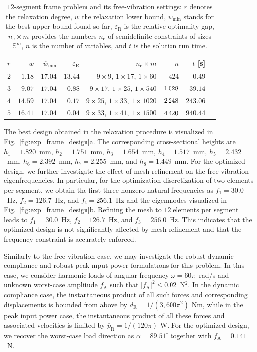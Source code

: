 \documentclass[preprint,3p]{elsarticle}
\newcommand{\A}{\mathrm{A}}
\newcommand{\R}{\mathrm{R}}
\numberwithin{equation}{section}
\begin{document}
\begin{table}[!b]
  \centering
    \begin{tabular}{lrrrrrrr}
		$r$ & $\underline{w}$ & $\overline{w}_{\min}$ & $\varepsilon_\R$ & $n_\mathrm{c}\times m$ & $n$ & $t$ [s]\\
		\hline
		$2$ & {$1.18$} & {$17.04$} & {$13.44$} & $9\times9$, $1\times 17$, $1\times60$ & $424$ & {$0.49$} \\
		$3$ & {$9.07$} & {$17.04$} & {$0.88$} & $9\times17$, $1\times 25$, $1\times540$ & $1\thinspace028$ & {$39.14$} \\
		$4$ & {$14.59$} & {$17.04$} & {$0.17$} & $9\times25$, $1\times 33$, $1\times1020$ & $2\thinspace248$ & {$243.06$} \\
		$5$ & {$16.41$} & {$17.04$} & {$0.04$} & $9\times33$, $1\times 41$, $1\times1500$ & $4\thinspace420$ & {$940.44$} \\
    \end{tabular}
    \caption{$12$-segment frame problem and its free-vibration settings: $r$ denotes the relaxation degree, $\underline{w}$ the relaxation lower bound, $\overline{w}_{\min}$ stands for the best upper bound found so far, $\varepsilon_\R$ is the relative optimality gap, $n_\mathrm{c} \times m$ provides the numbers $n_\mathrm{c}$ of semidefinite constraints of sizes $\mathbb{S}^m$, $n$ is the number of variables, and $t$ is the solution run time.}
    \label{tab:frame12}
\end{table}

The best design obtained in the relaxation procedure is visualized in Fig.~\ref{fig:exp_frame_design}a. The corresponding cross-sectional heights are $h_1 = 1.820$~mm, $h_2 = 1.751$~mm, $h_3 = 1.654$~mm, $h_4 = 1.517$~mm, $h_5 = 2.432$~mm, $h_6 = 2.392$~mm, $h_7 = 2.255$~mm, and $h_8 = 1.449$~mm. For the optimized design, we further investigate the effect of mesh refinement on the free-vibration eigenfrequencies. In particular, for the optimization discretization of two elements per segment, we obtain the first three nonzero natural frequencies as $f_1 = 30.0$~Hz, $f_2 = 126.7$~Hz, and $f_3 = 256.1$~Hz and the eigenmodes visualized in Fig.~\ref{fig:exp_frame_design}b. Refining the mesh to $12$ elements per segment leads to $f_1 = 30.0$~Hz, $f_2 = 126.7$~Hz, and $f_3 = 256.0$~Hz. This indicates that the optimized design is not significantly affected by mesh refinement and that the frequency constraint is accurately enforced.

Similarly to the free-vibration case, we may investigate the robust dynamic compliance and robust peak input power formulations for this problem. In this case, we consider harmonic loads of angular frequency $\omega = 60 \pi$~rad/s and unknown worst-case amplitude $f_{\A}$ such that $\lvert f_{\A}\rvert^2 \le 0.02$~N$^2$. In the dynamic compliance case, the instantaneous product of all such forces and corresponding displacements is bounded from above by $\overline{d}_\R = 1/(3,600 \pi^2)$ Nm, while in the peak input power case, the instantaneous product of all these forces and associated velocities is limited by $\overline{p}_\R = 1/(120 \pi)$ W. For the optimized design, we recover the worst-case load direction as $\alpha = 89.51^\circ$ together with $f_{\A} = 0.141$~N.
\end{document}
